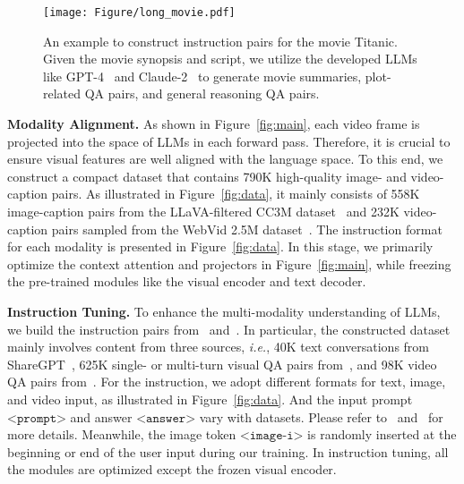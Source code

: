\begin{figure}[t!]
\centering
\texttt{[image: Figure/long\_movie.pdf]} 
\caption{
An example to construct instruction pairs for the movie Titanic.
Given the movie synopsis and script, we utilize the developed LLMs like GPT-4~\cite{GPT4} and Claude-2~\cite{Claude2} to generate movie summaries, plot-related QA pairs, and general reasoning QA pairs.
}
\label{fig:long_movie}
\end{figure}

\vspace{0.5em}
\noindent
\textbf{Modality Alignment.} 
As shown in Figure~\ref{fig:main}, each video frame is projected into the space of LLMs in each forward pass.
Therefore, it is crucial to ensure visual features are well aligned with the language space.
To this end, we construct a compact dataset that contains 790K high-quality image- and video-caption pairs.
As illustrated in Figure~\ref{fig:data}, it mainly consists of 558K image-caption pairs from the LLaVA-filtered CC3M dataset~\cite{cc3m} and 232K video-caption pairs sampled from the WebVid 2.5M dataset~\cite{webvid}.
The instruction format for each modality is presented in Figure~\ref{fig:data}.
In this stage, we primarily optimize the context attention and projectors in Figure~\ref{fig:main}, while freezing the pre-trained modules like the visual encoder and text decoder.

\vspace{0.5em}
\noindent
\textbf{Instruction Tuning.} 
To enhance the multi-modality understanding of LLMs, we build the instruction pairs from~\cite{llava1.5} and~\cite{videochatgpt}.
In particular, the constructed dataset mainly involves content from three sources, {\em i.e.}, 40K text conversations from ShareGPT~\cite{ShareGPT}, 625K single- or multi-turn visual QA pairs from~\cite{llava,vqav2,gqa,okvqa,ocrvqa,aokvqa,textcaps,referitgame,refcoco,vg}, and 98K video QA pairs from~\cite{activitynet}.
For the instruction, we adopt different formats for text, image, and video input, as illustrated in Figure~\ref{fig:data}.
And the input prompt $\texttt{<prompt>}$ and answer $\texttt{<answer>}$ vary with datasets.
Please refer to~\cite{llava1.5} and~\cite{videochatgpt} for more details.
Meanwhile, the image token $\texttt{<image-i>}$ is randomly inserted at the beginning or end of the user input during our training.
In instruction tuning, all the modules are optimized except the frozen visual encoder.

